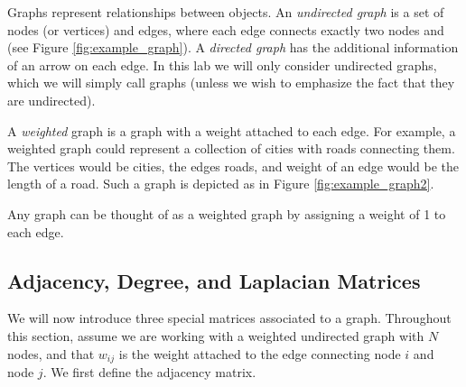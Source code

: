 %
%



Graphs represent relationships between objects.
An \emph{undirected graph} is a set of nodes (or vertices) and edges, where each edge connects exactly two nodes and (see Figure \ref{fig:example_graph}).
A \emph{directed graph} has the additional information of an arrow on each edge. 
In this lab we will only consider undirected graphs, which we will simply call graphs (unless we wish to emphasize the fact that they are undirected).


A \emph{weighted} graph is a graph with a weight attached to each edge.
For example, a weighted graph could represent a collection of cities with roads connecting them.
The vertices would be cities, the edges roads, and weight of an edge would be the length of a road.
Such a graph is depicted as in Figure \ref{fig:example_graph2}.

Any graph can be thought of as a weighted graph by assigning a weight of 1 to each edge.

\subsection*{Adjacency, Degree, and Laplacian Matrices}
We will now introduce three special matrices associated to a graph. 
Throughout this section, assume we are working with a weighted undirected graph with $N$ nodes, and that $w_{ij}$ is the weight attached to the edge connecting node $i$ and node $j$.
We first define the adjacency matrix.

